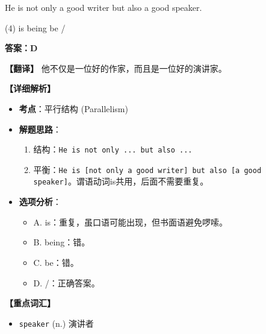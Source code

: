 \documentclass[11pt, a4paper]{article}
\newcommand{\analysis}[4]{
    \begin{solutionbox}
        \textbf{答案：#1}
        
        \textbf{【翻译】} #2
        
        \textbf{【详细解析】}
        #3
        
        \textbf{【重点词汇】}
        #4
    \end{solutionbox}
}
\newcommand{\blank}{\underline{\hspace{1.5cm}}}
\begin{document}
\begin{questions}
    \item He is not only a good writer but also \blank a good speaker.
    \begin{tasks}(4)
        \task is \task being \task be \task /
    \end{tasks}
    \analysis{D}{他不仅是一位好的作家，而且是一位好的演讲家。}{
        \begin{itemize}
            \item \textbf{考点}：平行结构 (Parallelism)
            \item \textbf{解题思路}：
                \begin{enumerate}
                    \item 结构：\texttt{He is not only ... but also ...}
                    \item 平衡：\texttt{He is [not only a good writer] but also [a good speaker]}。谓语动词is共用，后面不需要重复。
                \end{enumerate}
            \item \textbf{选项分析}：
                \begin{itemize}
                    \item A. is：重复，虽口语可能出现，但书面语避免啰嗦。
                    \item B. being：错。
                    \item C. be：错。
                    \item D. /：正确答案。
                \end{itemize}
        \end{itemize}
    }{
        \begin{itemize}
            \item \texttt{speaker} (n.) 演讲者
        \end{itemize}
    }


\end{questions}
\end{document}
